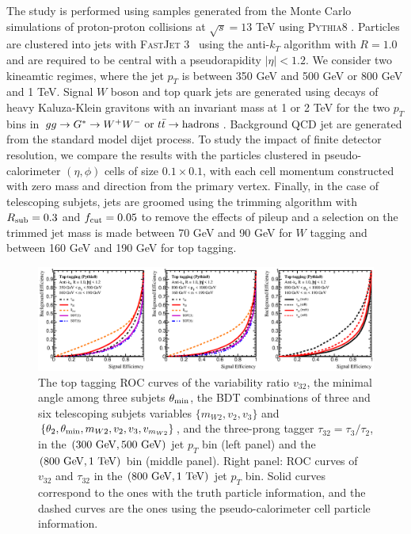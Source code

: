 \documentclass[aps,prl,floatfix,preprintnumbers,twocolumn,groupedaddress,nofootinbib]{revtex4-1}
\begin{document}
The study is performed using samples generated from the Monte Carlo simulations of proton-proton collisions at $\sqrt{s}=13$ TeV using \textsc{Pythia8} \cite{Sjostrand:2007gs}. Particles are clustered into jets with \textsc{FastJet} 3~\cite{Cacciari:2011ma} using the anti-$k_T$ algorithm \cite{Cacciari:2008gp} with $R=1.0$ and are required to be central with a pseudorapidity $|\eta|<1.2$. We consider two kineamtic regimes, where the jet $p_T$ is between 350 GeV and 500 GeV or 800 GeV and 1 TeV. Signal $W$ boson and top quark jets are generated using decays of heavy Kaluza-Klein gravitons with an invariant mass at 1 or 2 TeV for the two $p_T$ bins in $gg\rightarrow G^*\rightarrow W^+W^-~{\rm or}~t\bar t\rightarrow {\rm hadrons}$. Background QCD jet are generated from the standard model dijet process. To study the impact of finite detector resolution, we compare the results with the particles clustered in pseudo-calorimeter $(\eta,\phi)$ cells of size $0.1\times 0.1$, with each cell momentum constructed with zero mass and direction from the primary vertex. Finally, in the case of telescoping subjets, jets are groomed using the trimming algorithm with $R_{\rm sub}=0.3$ and $f_{\rm cut}=0.05$ to remove the effects of pileup and a selection on the trimmed jet mass is made between 70 GeV and 90 GeV for $W$ tagging and between 160 GeV and 190 GeV for top tagging.

\begin{figure}
    \includegraphics[width=2\columnwidth]{plots/Top_ROCs_1.eps}
    \caption{The top tagging ROC curves of the variability ratio $v_{32}$, the minimal angle among three subjets $\theta_{\rm min}$, the BDT combinations of three and six telescoping subjets variables $\{m_{W2},v_2,v_3\}$ and $\{\theta_2,\theta_{\rm min},m_{W2},v_2,v_3,v_{m_{W2}}\}$, and the three-prong tagger $\tau_{32}=\tau_{3}/\tau_{2}$, in the $(300~{\rm GeV}, 500~{\rm GeV})$ jet $p_T$ bin (left panel) and the $(800~{\rm GeV}, 1~{\rm TeV})$ bin (middle panel). Right panel: ROC curves of $v_{32}$ and $\tau_{32}$ in the $(800~{\rm GeV}, 1~{\rm TeV})$ jet $p_T$ bin. Solid curves correspond to the ones with the truth particle information, and the dashed curves are the ones using the pseudo-calorimeter cell particle information.}
\label{ROC_top}
\end{figure}
\end{document}
